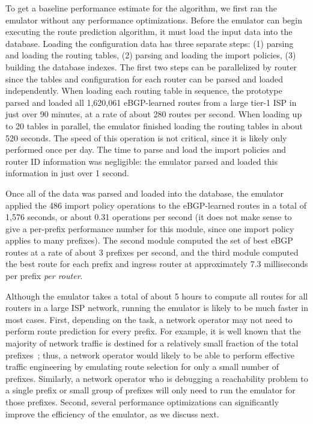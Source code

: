 To get a baseline performance estimate for the algorithm, we
first ran the emulator without any performance optimizations.
Before the emulator can begin executing the route prediction
algorithm, it must load the input data into the database.  Loading the
configuration data has three separate steps: (1) parsing and loading the
routing tables, (2) parsing and loading the import policies, (3)
building the database indexes.  The first two steps can be
parallelized by router since the tables and configuration for each
router can be parsed and loaded independently.  
When loading each routing table in sequence, the prototype parsed and
loaded all 1,620,061 eBGP-learned routes from a large tier-1 ISP in just
over 90 minutes, at a rate of about 280 routes per second. 
When loading up to 20 tables in parallel, the emulator finished loading
the routing tables in about 520 seconds.  The speed of this operation is
not critical, since it is likely only performed once per day.  The time
to parse and load the import policies and router ID information was
negligible: the emulator parsed and loaded this information in just
over 1 second.

Once all of the data was parsed and loaded into the database, the
emulator applied the 486 import policy operations to the eBGP-learned
routes in a total of 1,576 seconds, or about 0.31 operations per second
(it does not make sense to give a per-prefix performance number for this
module, since one import policy applies to many prefixes).
The second module computed the set of best eBGP routes at a rate of
about 3 prefixes per second, and the third module computed the best
route for each prefix and ingress router at approximately 7.3 milliseconds
per prefix {\em per router}.  

Although the emulator takes a total of about 5 hours to compute all
routes for all routers in a large ISP network, running the emulator is
likely to be much faster in most cases.  First, depending on the task, a
network operator may not need to perform route prediction for every
prefix.  For example, it is well known that the majority of network
traffic is destined for a relatively small fraction of the total
prefixes~\cite{Feamster2003e}; thus, a network operator would likely to be able
to perform effective traffic engineering by emulating route selection
for only a small number of prefixes.  Similarly, a network operator who
is debugging a reachability problem to a single prefix or small group of
prefixes will only need to run the emulator for those prefixes.  Second,
several performance optimizations can significantly improve the
efficiency of the emulator, as we discuss next.

